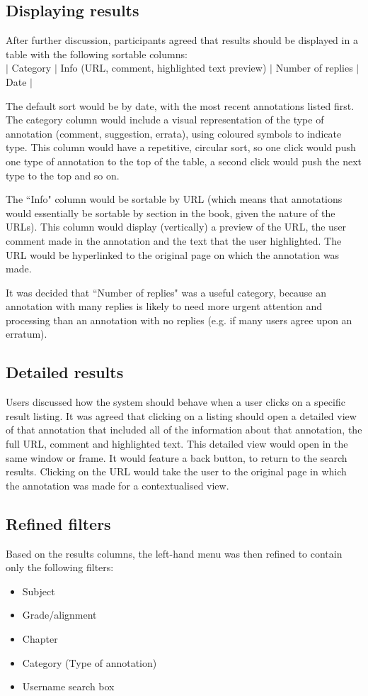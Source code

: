 \subsection{Displaying results}
After further discussion, participants agreed that results should be displayed in a table with the following sortable columns:\\ 
$\vert$ Category $\vert$ Info (URL, comment, highlighted text preview) $\vert$ Number of replies $\vert$ Date $\vert$

The default sort would be by date, with the most recent annotations listed first. The category column would include a visual representation of the type of annotation (comment, suggestion, errata), using coloured symbols to indicate type. This column would have a repetitive, circular sort, so one click would push one type of annotation to the top of the table, a second click would push the next type to the top and so on. 

The ``Info" column would be sortable by URL (which means that annotations would essentially be sortable by section in the book, given the nature of the URLs). This column would display (vertically) a preview of the URL, the user comment made in the annotation and the text that the user highlighted. The URL would be hyperlinked to the original page on which the annotation was made. 

It was decided that ``Number of replies" was a useful category, because an annotation with many replies is likely to need more urgent attention and processing than an annotation with no replies (e.g. if many users agree upon an erratum).

\subsection{Detailed results}
Users discussed how the system should behave when a user clicks on a specific result listing. It was agreed that clicking on a listing should open a detailed view of that annotation that included all of the information about that annotation, the full URL, comment and highlighted text. This detailed view would open in the same window or frame. It would feature a back button, to return to the search results. Clicking on the URL would take the user to the original page in which the annotation was made for a contextualised view. 

\subsection{Refined filters}
Based on the results columns, the left-hand menu was then refined to contain only the following filters:
\begin{itemize}
\item Subject
\item Grade/alignment
\item Chapter
\item Category (Type of annotation)
\item Username search box 
\end{itemize}

